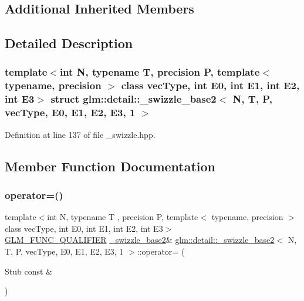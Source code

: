 \subsection*{Additional Inherited Members}


\subsection{Detailed Description}
\subsubsection*{template$<$int N, typename T, precision P, template$<$ typename, precision $>$ class vec\+Type, int E0, int E1, int E2, int E3$>$\newline
struct glm\+::detail\+::\+\_\+swizzle\+\_\+base2$<$ N, T, P, vec\+Type, E0, E1, E2, E3, 1 $>$}



Definition at line 137 of file \+\_\+swizzle.\+hpp.



\subsection{Member Function Documentation}
\mbox{\label{structglm_1_1detail_1_1__swizzle__base2_3_01_n_00_01_t_00_01_p_00_01vec_type_00_01_e0_00_01_e1_00_01_e2_00_01_e3_00_011_01_4_aefe588f8e3fc72f6be6350ba9524ae93}} 
\subsubsection{\texorpdfstring{operator=()}{operator=()}}
{\footnotesize\ttfamily template$<$int N, typename T , precision P, template$<$ typename, precision $>$ class vec\+Type, int E0, int E1, int E2, int E3$>$ \\
\mbox{\hyperlink{setup_8hpp_a33fdea6f91c5f834105f7415e2a64407}{G\+L\+M\+\_\+\+F\+U\+N\+C\+\_\+\+Q\+U\+A\+L\+I\+F\+I\+ER}} \mbox{\hyperlink{structglm_1_1detail_1_1__swizzle__base2}{\+\_\+swizzle\+\_\+base2}}\& \mbox{\hyperlink{structglm_1_1detail_1_1__swizzle__base2}{glm\+::detail\+::\+\_\+swizzle\+\_\+base2}}$<$ N, T, P, vec\+Type, E0, E1, E2, E3, 1 $>$\+::operator= (\begin{DoxyParamCaption}\item[{Stub const \&}]{ }\end{DoxyParamCaption})\hspace{0.3cm}{\ttfamily [inline]}}



